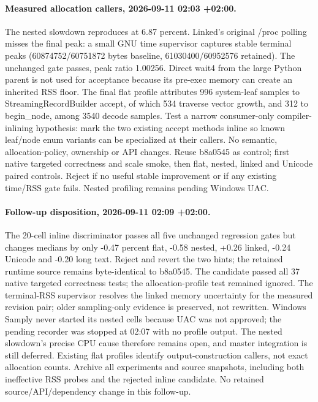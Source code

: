\documentclass[11pt,a4paper]{article}
\begin{document}
\paragraph{Measured allocation callers, 2026-09-11 02:03 +02:00.}
The nested slowdown reproduces at 6.87 percent. Linked's original /proc polling
misses the final peak: a small GNU time supervisor captures stable terminal peaks
(60874752/60751872 bytes baseline, 61030400/60952576 retained). The unchanged gate
passes, peak ratio 1.00256. Direct wait4 from the large Python parent is not used
for acceptance because its pre-exec memory can create an inherited RSS floor.
The final flat profile attributes 996 system-leaf samples to StreamingRecordBuilder
accept, of which 534 traverse vector growth, and 312 to begin\_node, among 3540 decode
samples. Test a narrow consumer-only compiler-inlining hypothesis: mark the two
existing accept methods inline so known leaf/node enum variants can be specialized
at their callers. No semantic, allocation-policy, ownership or API changes. Reuse
b8a0545 as control; first native targeted correctness and scale smoke, then flat,
nested, linked and Unicode paired controls. Reject if no useful stable improvement
or if any existing time/RSS gate fails. Nested profiling remains pending Windows UAC.

\paragraph{Follow-up disposition, 2026-09-11 02:09 +02:00.}
The 20-cell inline discriminator passes all five unchanged regression gates but
changes medians by only -0.47 percent flat, -0.58 nested, +0.26 linked, -0.24
Unicode and -0.20 long text. Reject and revert the two hints; the retained runtime
source remains byte-identical to b8a0545. The candidate passed all 37 native targeted
correctness tests; the allocation-profile test remained ignored. The terminal-RSS
supervisor resolves the linked memory uncertainty for the measured revision pair;
older sampling-only evidence is preserved, not rewritten. Windows Samply never
started its nested cells because UAC was not approved; the pending recorder was
stopped at 02:07 with no profile output. The nested slowdown's precise CPU cause
therefore remains open, and master integration is still deferred. Existing flat
profiles identify output-construction callers, not exact allocation counts. Archive
all experiments and source snapshots, including both ineffective RSS probes and the
rejected inline candidate. No retained source/API/dependency change in this follow-up.

\begin{center}\end{center}
\end{document}
